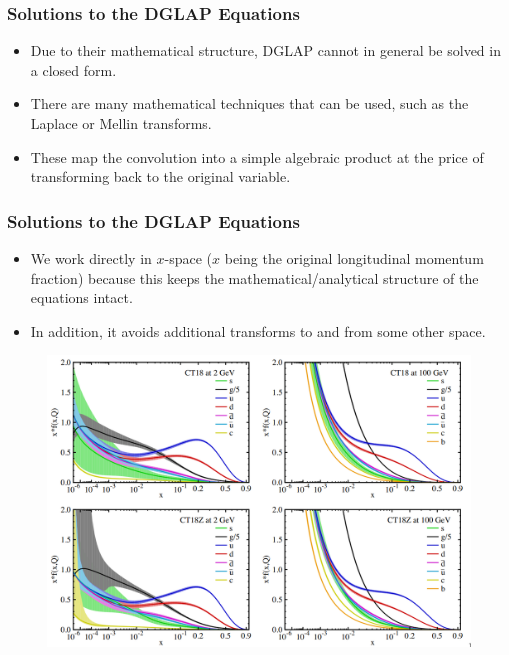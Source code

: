 \documentclass{beamer}
\begin{document}
\begin{frame}
  \frametitle{Solutions to the DGLAP Equations}

  \begin{itemize}
  \item Due to their mathematical structure, DGLAP cannot in general be solved in a closed form. \\[1cm]
  \item There are many mathematical techniques that can be used, such as the Laplace or Mellin transforms. \\[1cm]
  \item  These map the convolution into a simple algebraic product at the price of transforming back to the original variable.
  \end{itemize}

  \vspace*{3cm}
\end{frame}


\begin{frame}
  \frametitle{Solutions to the DGLAP Equations}

  \begin{itemize}
  \item We work directly in $x$-space ($x$ being the original longitudinal momentum fraction) because this keeps the mathematical/analytical structure of the equations intact.
  \item In addition, it avoids additional transforms to and from some other space.
  \end{itemize}

  \begin{figure}
    \centering
    \includegraphics[width=0.6\linewidth]{./gfx/cteq-pdfs.png}
  \end{figure}
  
\end{frame}
  
\end{document}

